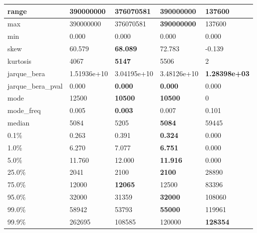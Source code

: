 \begin{table}[H]
\begin{tabular}{|l|m{10em}|m{10em}|m{10em}|m{10em}|}
\hline range & 390000000 & 376070581 & \bfseries 390000000 & \cellcolor[rgb]{0.9, 0.54, 0.52} 137600 \\
\hline max & 390000000 & 376070581 & \bfseries 390000000 & \cellcolor[rgb]{0.9, 0.54, 0.52} 137600 \\
\hline min & 0.000 & 0.000 & 0.000 & 0.000 \\
\hline skew & 60.579 & \bfseries 68.089 & 72.783 & \cellcolor[rgb]{0.9, 0.54, 0.52} -0.139 \\
\hline kurtosis & 4067 & \bfseries 5147 & 5506 & \cellcolor[rgb]{0.9, 0.54, 0.52} 2 \\
\hline jarque\_bera & 1.51936e+10 & 3.04195e+10 & \cellcolor[rgb]{0.9, 0.54, 0.52} 3.48126e+10 & \bfseries 1.28398e+03 \\
\hline jarque\_bera\_pval & 0.000 & \bfseries 0.000 & \bfseries 0.000 & \cellcolor[rgb]{0.9, 0.54, 0.52} 0.000 \\
\hline mode & 12500 & \bfseries 10500 & \bfseries 10500 & \cellcolor[rgb]{0.9, 0.54, 0.52} 0 \\
\hline mode\_freq & 0.005 & \bfseries 0.003 & 0.007 & \cellcolor[rgb]{0.9, 0.54, 0.52} 0.101 \\
\hline median & 5084 & 5205 & \bfseries 5084 & \cellcolor[rgb]{0.9, 0.54, 0.52} 59445 \\
\hline 0.1\% & 0.263 & 0.391 & \bfseries 0.324 & \cellcolor[rgb]{0.9, 0.54, 0.52} 0.000 \\
\hline 1.0\% & 6.270 & 7.077 & \bfseries 6.751 & \cellcolor[rgb]{0.9, 0.54, 0.52} 0.000 \\
\hline 5.0\% & 11.760 & 12.000 & \bfseries 11.916 & \cellcolor[rgb]{0.9, 0.54, 0.52} 0.000 \\
\hline 25.0\% & 2041 & 2100 & \bfseries 2100 & \cellcolor[rgb]{0.9, 0.54, 0.52} 28890 \\
\hline 75.0\% & 12000 & \bfseries 12065 & 12500 & \cellcolor[rgb]{0.9, 0.54, 0.52} 83396 \\
\hline 95.0\% & 32000 & 31359 & \bfseries 32000 & \cellcolor[rgb]{0.9, 0.54, 0.52} 108060 \\
\hline 99.0\% & 58942 & 53793 & \bfseries 55000 & \cellcolor[rgb]{0.9, 0.54, 0.52} 119961 \\
\hline 99.9\% & 262695 & \cellcolor[rgb]{0.9, 0.54, 0.52} 108585 & 120000 & \bfseries 128354 \\
\hline
\end{tabular}
\end{table}
